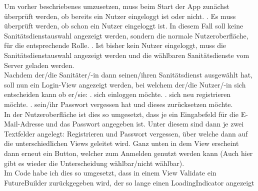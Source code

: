         
        \noindent Um vorher beschriebenes umzusetzen, muss beim Start der App zunächst überprüft werden, 
        ob bereits ein Nutzer eingeloggt ist oder nicht.
        . Es muss überprüft werden, ob schon ein Nutzer eingeloggt ist. In diesem 
        Fall soll keine Sanitätsdienstauswahl angezeigt werden, sondern
        die normale Nutzeroberfläche, für die entsprechende Rolle.
        . Ist bisher kein Nutzer eingeloggt, muss die Sanitätsdienstauswahl 
        angezeigt werden und die wählbaren Sanitätsdienste vom Server geladen 
        werden.
        \newline\\
        Nachdem der/die Sanitäter/-in dann seinen/ihren Sanitätsdienst ausgewählt hat,
        soll nun ein Login-View angezeigt werden, bei welchem der/die Nutzer/-in sich entscheiden 
        kann ob er/sie:
        . sich einloggen möchte.
        . sich neu registrieren möchte.
        . sein/ihr Passwort vergessen hat und dieses zurücksetzen möchte.
        \newline\\
        In der Nutzeroberfläche ist dies so umgesetzt, dass je ein Eingabefeld für
        die E-Mail-Adresse und das Passwort angegeben ist. Unter diesem sind dann je
        zwei Textfelder angelegt: \glqq Registrieren\grqq{} und \glqq Passwort vergessen\grqq{}, über
        welche dann auf die unterschiedlichen Views geleitet wird. Ganz unten in dem
        View erscheint dann erneut ein Button, welcher zum Anmelden genutzt werden 
        kann (Auch hier gibt es wieder die Unterscheidung wählbar/nicht wählbar).
        \\
        Im Code habe ich dies so umgesetzt, dass in einem View \glqq Validate\grqq{} ein 
        \glqq FutureBuilder\grqq{} zurückgegeben wird, der so lange einen LoadingIndicator angezeigt
